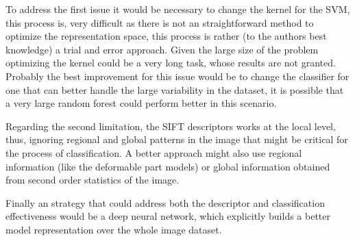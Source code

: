 \documentclass[10pt,twocolumn,letterpaper]{article}
\begin{document}
To address the first issue it would be necessary to change the kernel for the SVM, this process is, very difficult as there is not an straightforward method to optimize the representation space,  this process is rather (to the authors best knowledge) a trial and error approach. Given the large size of the problem optimizing the kernel  could be a very long task, whose results are not granted. Probably the best improvement for this issue would be to change the classifier for one that can better handle the large variability in the dataset, it is possible that a very large random forest could perform better in this scenario.

Regarding the second limitation, the SIFT descriptors works at the local level, thus, ignoring regional and global patterns in the image that might be critical for the process of classification. A better approach might also use regional information (like the deformable part models\cite{Felzenszwalb2010}) or global information obtained from second order statistics of the image.

Finally an strategy that could address both the descriptor and classification effectiveness would be a deep neural network, which explicitly builds a better model representation over the whole image dataset.

{\small


}
\end{document}
